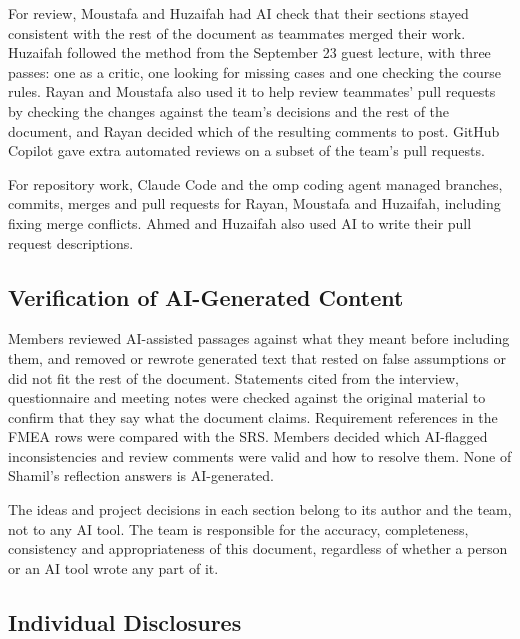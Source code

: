 \documentclass{article}
\begin{document}
For review, Moustafa and Huzaifah had AI check that their sections stayed
consistent with the rest of the document as teammates merged their work.
Huzaifah followed the method from the September 23 guest lecture, with
three passes: one as a critic, one looking for missing cases and one
checking the course rules. Rayan and Moustafa also used it to help review
teammates' pull requests by checking the changes against the team's
decisions and the rest of the document, and Rayan decided which of the
resulting comments to post. GitHub Copilot gave extra automated reviews on
a subset of the team's pull requests.

For repository work, Claude Code and the omp coding agent managed branches,
commits, merges and pull requests for Rayan, Moustafa and Huzaifah,
including fixing merge conflicts. Ahmed and Huzaifah also used AI to write
their pull request descriptions.

\subsection{Verification of AI-Generated Content}

Members reviewed AI-assisted passages against what they meant before
including them, and removed or rewrote generated text that rested on false
assumptions or did not fit the rest of the document. Statements cited from
the interview, questionnaire and meeting notes were checked against the
original material to confirm that they say what the document claims.
Requirement references in the FMEA rows were compared with the SRS. Members
decided which AI-flagged inconsistencies and review comments were valid and
how to resolve them. None of Shamil's reflection answers is AI-generated.

The ideas and project decisions in each section belong to its author and
the team, not to any AI tool. The team is responsible for the accuracy,
completeness, consistency and appropriateness of this document, regardless
of whether a person or an AI tool wrote any part of it.

\subsection*{Individual Disclosures}
\end{document}
